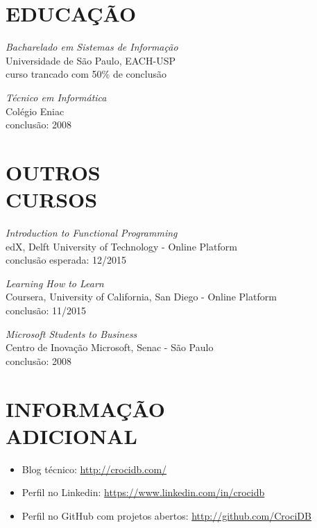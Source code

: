 \documentclass[line,margin]{res}
\begin{document}
\begin{resume}
 
\section{EDUCAÇÃO} {\sl Bacharelado em Sistemas de Informação} \\
                Universidade de São Paulo, EACH-USP \\
                curso trancado com 50\% de conclusão
                
                {\sl Técnico em Informática} \\
                Colégio Eniac \\
                conclusão: 2008 \\

\section{OUTROS \\ CURSOS}     
            {\sl Introduction to Functional Programming} \\
            edX, Delft University of Technology - Online Platform \\
            conclusão esperada: 12/2015

           {\sl Learning How to Learn} \\
            Coursera, University of California, San Diego - Online Platform\\
            conclusão: 11/2015

           {\sl Microsoft Students to Business} \\
                Centro de Inovação Microsoft, Senac - São Paulo \\
                conclusão: 2008 

\section{INFORMAÇÃO \\ ADICIONAL}
            \begin{itemize}  \itemsep 1pt
            \item Blog técnico: \href{http://crocidb.com/}{http://crocidb.com/}
            \item Perfil no Linkedin: \href{https://www.linkedin.com/in/crocidb}{https://www.linkedin.com/in/crocidb}
            \item Perfil no GitHub com projetos abertos: \href{http://github.com/CrociDB}{http://github.com/CrociDB}
            \end{itemize} 

\end{resume}
\end{document}

